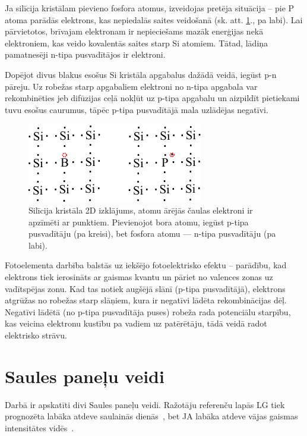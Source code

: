 Ja silīcija kristālam pievieno fosfora atomus, izveidojas pretēja situācija -- pie P atoma parādās elektrons, kas nepiedalās saites veidošanā (sk. att. \ref{fig:p-n-type}., pa labi). Lai pārvietotos, brīvajam elektronam ir nepieciešams mazāk enerģijas nekā elektroniem, kas veido kovalentās saites starp Si atomiem. Tātad, lādiņa pamatnesēji n-tipa pusvadītājos ir elektroni.

Dopējot divus blakus esošus Si kristāla apgabalus dažādā veidā, iegūst p-n pāreju. Uz robežas starp apgabaliem elektroni no n-tipa apgabala var rekombinēties jeb difūzijas ceļā nokļūt uz p-tipa apgabalu un aizpildīt pietiekami tuvu esošus caurumus, tāpēc p-tipa pusvadītājā mala uzlādējas negatīvi.

\begin{figure}[h]
	\centering
	\includegraphics[width=0.5\linewidth]{figures/misc/p_n_type.pdf}
	\caption{Silīcija kristāla 2D izklājums, atomu ārējās čaulas elektroni ir apzīmēti ar punktiem. Pievienojot bora atomu, iegūst p-tipa pusvadītāju (pa kreisi), bet fosfora atomu --- n-tipa pusvadītāju (pa labi).}
	\label{fig:p-n-type}
\end{figure}

Fotoelementa darbība balstās uz iekšējo fotoelektrisko efektu -- parādību, kad elektrons tiek ierosināts ar gaismas kvantu un pāriet no valences zonas uz vadītspējas zonu. Kad tas notiek augšējā slānī (p-tipa pusvadītājā), elektrons atgrūžas no robežas starp slāņiem, kura ir negatīvi lādēta rekombinācijas dēļ. Negatīvi lādētā (no p-tipa pusvadītāja puses) robeža rada potenciālu starpību, kas veicina elektronu kustību pa vadiem uz patērētāju, tādā veidā radot elektrisko strāvu.

\section{Saules paneļu veidi}

Darbā ir apskatīti divi Saules paneļu veidi. Ražotāju referenču lapās LG tiek prognozēta labāka atdeve saulainās dienās~\cite{LGtips}, bet JA labāka atdeve vājas gaismas intensitātes vidēs~\cite{JAtips}.

